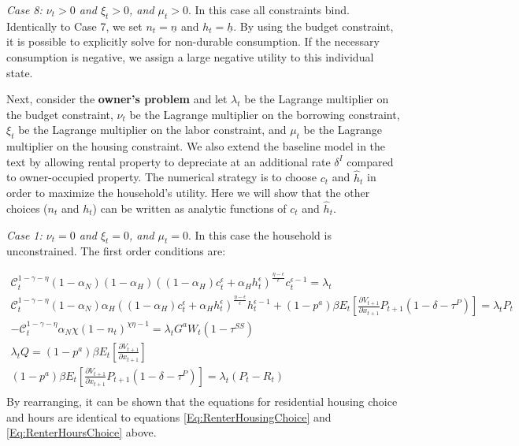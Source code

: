 \documentclass[letterpaper,12pt,dvipsnames,usenames]{article}
\theoremstyle{definition}
\begin{document}
\begin{spacing}{1.0}
\begin{small}
\emph{Case 8: $\nu_{t}>0$ and $\xi_{t}>0$, and $\mu_{t}>0$}. In this case all constraints bind. Identically to Case 7, we set $n_{t}=\underline{n}$ and $h_{t}=\underline{h}$. By using the budget constraint, it is possible to explicitly solve for non-durable consumption. If the necessary consumption is negative, we assign a large negative utility to this individual state.

Next, consider the \textbf{owner's problem} and let $\lambda_{t}$ be the Lagrange multiplier on the budget constraint, $\nu_{t}$ be the Lagrange multiplier on the borrowing constraint, $\xi_{t}$ be the Lagrange multiplier on the labor constraint, and $\mu_{t}$ be the Lagrange multiplier on the housing constraint. We also extend the baseline model in the text by allowing rental property to depreciate at an additional rate $\delta^{I}$ compared to owner-occupied property. The numerical strategy is to choose $c_{t}$ and $\widehat{h}_{t}$ in order to maximize the household's utility. Here we will show that the other choices ($n_{t}$ and $h_{t}$) can be written as analytic functions of $c_{t}$ and $\widehat{h}_{t}$.

\emph{Case 1: $\nu_{t}=0$ and $\xi_{t}=0$, and $\mu_{t}=0$}. In this case the household is unconstrained. The first order conditions are:

\begin{equation}\label{Eq:OwnerFOC}
\begin{array}{l}
\mathcal{C}_{t}^{1-\gamma-\eta}(1-\alpha_{N})(1-\alpha_{H})((1-\alpha_{H})c_{t}^{\epsilon}+\alpha_{H}h_{t}^{\epsilon})^{\frac{\eta-\epsilon}{\epsilon}}c_{t}^{\epsilon-1}=\lambda_{t}\\
\mathcal{C}_{t}^{1-\gamma-\eta}(1-\alpha_{N})\alpha_{H}((1-\alpha_{H})c_{t}^{\epsilon}+\alpha_{H}h_{t}^{\epsilon})^{\frac{\eta-\epsilon}{\epsilon}}h_{t}^{\epsilon-1}+(1-p^a)\beta E_{t}[\frac{\partial V_{t+1}}{\partial x_{t+1}}P_{t+1}(1-\delta-\tau^{P})]=\lambda_{t}P_{t}\\
-\mathcal{C}_{t}^{1-\gamma-\eta}\alpha_{N}\chi(1-n_{t})^{\chi\eta-1}=\lambda_{t}G^{a}W_{t}(1-\tau^{SS})\\
\lambda_{t}Q=(1-p^a)\beta E_{t}[\frac{\partial V_{t+1}}{\partial x_{t+1}}]\\
(1-p^a)\beta E_{t}[\frac{\partial V_{t+1}}{\partial x_{t+1}}P_{t+1}(1-\delta-\tau^{P})]=\lambda_{t}(P_{t}-R_{t})\\
\end{array}
\end{equation}
By rearranging, it can be shown that the equations for residential housing choice and hours are identical to equations \eqref{Eq:RenterHousingChoice} and \eqref{Eq:RenterHoursChoice} above.


\end{small}
\end{spacing}
\end{document}
